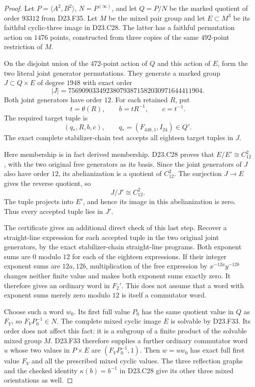\begin{proof}
Let $P=\langle A^2,B^2\rangle$, $N=P^{(\infty)}$, and
let $Q=P/N$ be the marked quotient of order $93312$
from D23.F35. Let $M$ be the mixed pair group and let
$E\subset M^3$ be its faithful cyclic-three image in
D23.C28. The latter has a faithful permutation action
on $1476$ points, constructed from three copies of
the same $492$-point restriction of $M$.

On the disjoint union of the $472$-point action of $Q$
and this action of $E$, form the two literal joint
generator permutations. They generate a marked group
$J\subset Q\times E$ of degree $1948$ with exact order
\[
       |J|=756909033492380793871582030971644411904.
\]
Both joint generators have order $12$.
For each retained $R$, put
\[
       t=\theta(R),\qquad b=tR^{-1},\qquad c=t^{-1}.
\]
The required target tuple is
\[
                 (q_*,R,b,c),\qquad
                 q_*=(F_{448,1},I_{24})\in Q'.
\]
The exact complete stabilizer-chain test accepts all
eighteen target tuples in $J$.

Here membership is in fact derived membership. D23.C28
proves that $E/E'\cong C_{12}^2$, with the two original
free generators as its basis. Since the joint
generators of $J$ also have order $12$, its
abelianization is a quotient of $C_{12}^2$. The
surjection $J\to E$ gives the reverse quotient, so
\[
                      J/J'\cong C_{12}^2.
\]
The tuple projects into $E'$, and hence its image in
this abelianization is zero. Thus every accepted tuple
lies in $J'$.

The certificate gives an additional direct check of
this last step. Recover a straight-line expression for
each accepted tuple in the two original joint
generators, by the exact stabilizer-chain straight-line
programs. Both exponent sums are $0$ modulo $12$ for
each of the eighteen expressions. If their integer
exponent sums are $12a,12b$, multiplication of the
free expression by $x^{-12a}y^{-12b}$ changes neither
finite value and makes both exponent sums exactly
zero. It therefore gives an ordinary word in $F_2'$.
This does not assume that a word with exponent sums
merely zero modulo $12$ is itself a commutator word.

Choose such a word $w_0$. Its first full value $P_0$
has the same quotient value in $Q$ as $F_V$, so
$F_VP_0^{-1}\in N$. The complete mixed cyclic image
$E$ is solvable by D23.F33. Its order does not affect
this fact: it is a subgroup of a finite product of
the solvable mixed group $M$.
D23.F33 therefore supplies a further ordinary
commutator word $u$ whose two values in $P\times E$
are $(F_VP_0^{-1},1)$. Then $w=uw_0$ has exact
full first value $F_V$ and all the prescribed mixed
cyclic values. The three reflection graphs and the
checked identity $\kappa(b)=b^{-1}$ in D23.C28
give its other three mixed orientations as well.


\end{proof}
